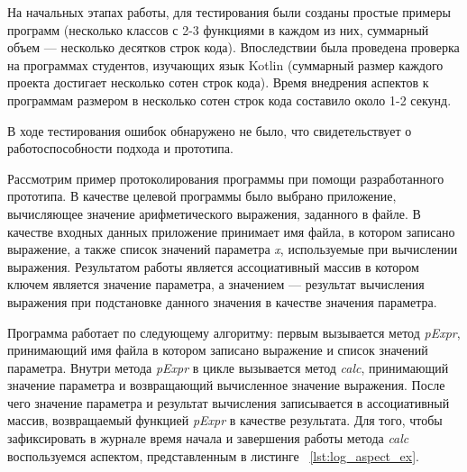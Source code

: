 \documentclass[conference]{IEEEtran}
\begin{document}
На начальных этапах работы, для тестирования были созданы простые примеры 
программ (несколько классов с 2-3 функциями в каждом из них, суммарный объем
--- несколько десятков строк кода).
Впоследствии была проведена проверка на программах студентов, изучающих язык
Kotlin (суммарный размер каждого проекта достигает несколько сотен строк кода).
Время внедрения аспектов к программам размером в несколько сотен строк кода
составило около 1-2 секунд.

В ходе тестирования ошибок обнаружено не было, что свидетельствует о
работоспособности подхода и прототипа.


Рассмотрим пример протоколирования программы при помощи разработанного
прототипа.
В качестве целевой программы было выбрано приложение, вычисляющее значение
арифметического выражения, заданного в файле.
В качестве входных данных приложение принимает имя файла, в котором записано
выражение, а также список значений параметра \textit{x}, используемые при
вычислении выражения.
Результатом работы является ассоциативный массив в котором ключем является
значение параметра, а значением --- результат вычисления выражения при
подстановке данного значения в качестве значения параметра.

Программа работает по следующему алгоритму: первым вызывается метод
\textit{pExpr}, принимающий имя файла в котором записано выражение и список
значений параметра.
Внутри метода \textit{pExpr} в цикле вызывается метод \textit{calc}, принимающий
значение параметра и возвращающий вычисленное значение выражения.
После чего значение параметра и результат вычисления записывается в
ассоциативный массив, возвращаемый функцией \textit{pExpr} в качестве
результата.
Для того, чтобы зафиксировать в журнале время начала и завершения работы метода
\textit{calc} воспользуемся аспектом, представленным в листинге
~\ref{lst:log_aspect_ex}.
\end{document}
